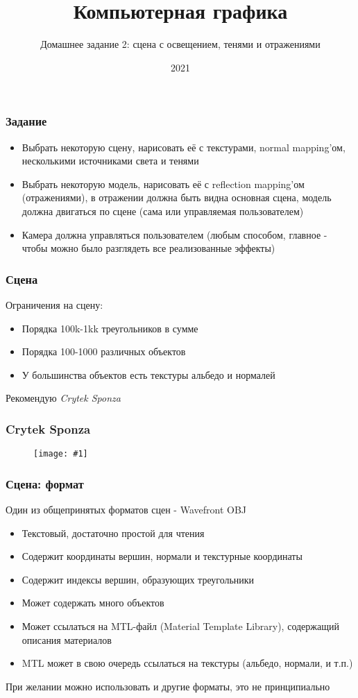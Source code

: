 \documentclass{beamer}
\title{Компьютерная графика}
\subtitle{Домашнее задание 2: сцена с освещением, тенями и отражениями}
\date{2021}
\newcommand{\slideimage}[1]{
  \begin{figure}
    \begin{adjustbox}{width=\textwidth, totalheight=\textheight-2\baselineskip-2\baselineskip,keepaspectratio}
      \texttt{[image: \#1]}
    \end{adjustbox}
  \end{figure}
}
\begin{document}
\frame{\titlepage}

\begin{frame}[fragile]
\frametitle{Задание}
\begin{itemize}
\item Выбрать некоторую сцену, нарисовать её с текстурами, normal mapping'ом, несколькими источниками света и тенями
\pause
\item Выбрать некоторую модель, нарисовать её с reflection mapping'ом (отражениями), в отражении должна быть видна основная сцена, модель должна двигаться по сцене (сама или управляемая пользователем)
\pause
\item Камера должна управляться пользователем (любым способом, главное - чтобы можно было разглядеть все реализованные эффекты)
\end{itemize}
\end{frame}

\begin{frame}[fragile]
\frametitle{Сцена}
Ограничения на сцену:
\begin{itemize}
\item Порядка 100k-1kk треугольников в сумме
\item Порядка 100-1000 различных объектов
\item У большинства объектов есть текстуры альбедо и нормалей
\end{itemize}
Рекомендую \textit{Crytek Sponza}
\end{frame}

\begin{frame}[fragile]
\frametitle{Crytek Sponza}
\slideimage{crytek-sponza.jpg}
\end{frame}

\begin{frame}[fragile]
\frametitle{Сцена: формат}
Один из общепринятых форматов сцен - Wavefront OBJ
\begin{itemize}
\item Текстовый, достаточно простой для чтения
\item Содержит координаты вершин, нормали и текстурные координаты
\item Содержит индексы вершин, образующих треугольники
\item Может содержать много объектов
\item Может ссылаться на MTL-файл (Material Template Library), содержащий описания материалов
\item MTL может в свою очередь ссылаться на текстуры (альбедо, нормали, и т.п.)
\end{itemize}
При желании можно использовать и другие форматы, это не принципиально
\end{frame}
\end{document}
